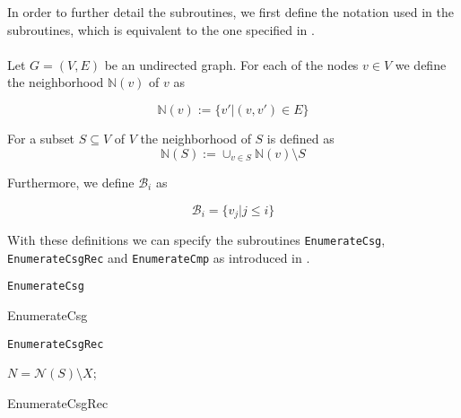 In order to further detail the subroutines, we first define the notation used in the subroutines, which is equivalent to the one specified in \cite{moerkotte2009building}. 
\\\\
Let $G = (V,E)$ be an undirected graph. For each of the nodes $v \in V$ we define the neighborhood $\mathbb{N}(v)$ of $v$ as 

\begin{equation}
    \mathbb{N}(v) := \{v' \vert (v,v') \in E\}
\end{equation}

For a subset $S \subseteq V$ of $V$ the neighborhood of $S$ is defined as 
\begin{equation}
    \mathbb{N}(S) := \cup_{v \in S}\mathbb{N}(v) \setminus S
\end{equation}

Furthermore, we define $\mathcal{B}_i$ as

\begin{equation}
    \mathcal{B}_i = \{v_j \vert j \leq i\}
\end{equation}

\vspace{0.5cm}

With these definitions we can specify the subroutines \texttt{EnumerateCsg}, \texttt{EnumerateCsgRec} and \texttt{EnumerateCmp} as introduced in \cite{moerkotte2006analysis}.

\vspace{0.3cm}

\texttt{EnumerateCsg}

\begin{algorithm}[H]
\BlankLine
{}
\vspace{0.5cm}
\caption{EnumerateCsg}
\end{algorithm}

\vspace{0.5cm}

\texttt{EnumerateCsgRec}

\begin{algorithm}[H]
    \BlankLine
    $N = \mathcal{N}(S) \setminus X$;\\
\vspace{0.5cm}
\caption{EnumerateCsgRec}
\end{algorithm}

